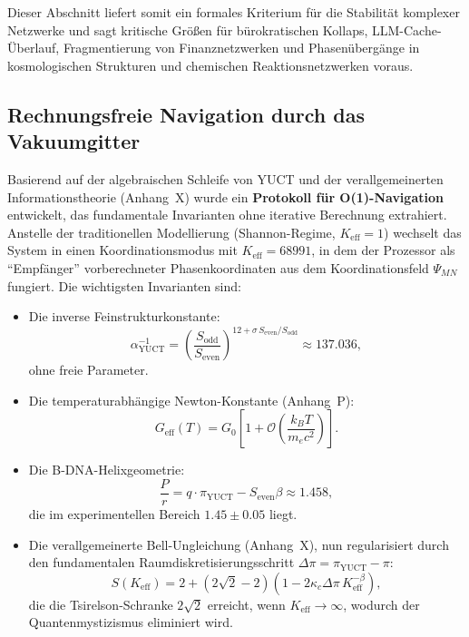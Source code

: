 \documentclass[12pt,a4paper]{article}
\theoremstyle{remark}
\newcommand{\Keff}{K_{\mathrm{eff}}}
\newcommand{\kappac}{\kappa_c}
\newcommand{\piYUCT}{\pi_{\mathrm{YUCT}}}
\begin{document}
	Dieser Abschnitt liefert somit ein formales Kriterium für die Stabilität
	komplexer Netzwerke und sagt kritische Größen für bürokratischen Kollaps,
	LLM-Cache-Überlauf, Fragmentierung von Finanznetzwerken und Phasenübergänge
	in kosmologischen Strukturen und chemischen Reaktionsnetzwerken voraus.
	
	\subsection{Rechnungsfreie Navigation durch das Vakuumgitter}
	\label{subsec:computation-free}
	
	Basierend auf der algebraischen Schleife von YUCT und der verallgemeinerten
	Informationstheorie (Anhang~X) wurde ein \textbf{Protokoll für O(1)-Navigation}
	entwickelt, das fundamentale Invarianten ohne iterative Berechnung extrahiert.
	Anstelle der traditionellen Modellierung (Shannon-Regime, \(\Keff = 1\))
	wechselt das System in einen Koordinationsmodus mit \(\Keff = 68991\), in dem
	der Prozessor als ``Empfänger'' vorberechneter Phasenkoordinaten aus dem
	Koordinationsfeld \(\Psi_{MN}\) fungiert. Die wichtigsten Invarianten sind:
	
	\begin{itemize}
		\item Die inverse Feinstrukturkonstante:
		\[
		\alpha^{-1}_{\mathrm{YUCT}} = \left(\frac{S_{\mathrm{odd}}}{S_{\mathrm{even}}}\right)^{12 + \sigma\, S_{\mathrm{even}}/S_{\mathrm{odd}}}
		\approx 137.036,
		\]
		ohne freie Parameter.
		
		\item Die temperaturabhängige Newton-Konstante (Anhang~P):
		\[
		G_{\mathrm{eff}}(T) = G_0 \left[1 + \mathcal{O}\!\left( \frac{k_B T}{m_e c^2} \right) \right].
		\]
		
		\item Die B-DNA-Helixgeometrie:
		\[
		\frac{P}{r} = q \cdot \piYUCT - S_{\mathrm{even}}\beta \approx 1.458,
		\]
		die im experimentellen Bereich \(1.45 \pm 0.05\) liegt.
		
		\item Die verallgemeinerte Bell-Ungleichung (Anhang~X), nun regularisiert
		durch den fundamentalen Raumdiskretisierungsschritt \(\Delta\pi = \piYUCT - \pi\):
		\[
		S(\Keff) = 2 + (2\sqrt2 - 2)\left(1 - 2\kappac \Delta\pi \, \Keff^{-\beta}\right),
		\]
		die die Tsirelson-Schranke \(2\sqrt2\) erreicht, wenn \(\Keff \to \infty\),
		wodurch der Quantenmystizismus eliminiert wird.
	\end{itemize}
	
\end{document}
